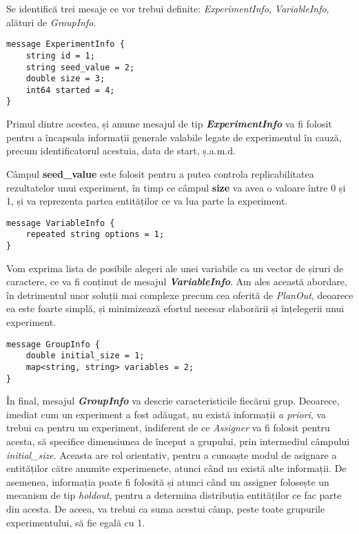 Se identifică trei mesaje ce vor trebui definite: \textit{ExperimentInfo}, \textit{VariableInfo}, alături de \textit{GroupInfo}.

\begin{center}
	\begin{lstlisting}[language=proto3]
message ExperimentInfo {
	string id = 1;
	string seed_value = 2;
	double size = 3;
	int64 started = 4;
}
	\end{lstlisting}
\end{center}

Primul dintre acestea, și anume mesajul de tip \textbf{\textit{ExperimentInfo}} va fi folosit pentru a încapsula informații generale valabile legate de experimentul în cauză, precum identificatorul acestuia, data de start, ș.a.m.d.

\begin{remark}
	Câmpul \textbf{seed\_value} este folosit pentru a putea controla replicabilitatea rezultatelor unui experiment, în timp ce câmpul \textbf{size} va avea o valoare între 0 și 1, și va reprezenta partea entităților ce va lua parte la experiment.
\end{remark}

\begin{lstlisting}[language=proto3]
message VariableInfo {
	repeated string options = 1;
}
\end{lstlisting}

Vom exprima lista de posibile alegeri ale unei variabile ca un vector de șiruri de caractere, ce va fi conținut de mesajul \textbf{\textit{VariableInfo}}. Am ales această abordare, în detrimentul unor soluții mai complexe precum cea oferită de \textit{PlanOut}, deoarece ea este foarte simplă, și minimizează efortul necesar elaborării și înțelegerii unui experiment.

\begin{center}
	\begin{lstlisting}[language=proto3]
message GroupInfo {
	double initial_size = 1;
	map<string, string> variables = 2;
}
	\end{lstlisting}
\end{center}

În final, mesajul \textbf{\textit{GroupInfo}} va descrie caracteristicile fiecărui grup. Deoarece, imediat cum un experiment a fost adăugat, nu există informații \textit{a priori}, va trebui ca pentru un experiment, indiferent de ce \textit{Assigner} va fi folosit pentru acesta, să specifice dimensiunea de început a grupului, prin intermediul câmpului \textit{initial\_size}. Aceasta are rol orientativ, pentru a cunoaște modul de asignare a entităților către anumite experimenete, atunci când nu există alte informații. De asemenea, informația poate fi folosită și atunci când un assigner folosește un mecanism de tip \textit{holdout}, pentru a determina distribuția entităților ce fac parte din acesta. De aceea, va trebui ca suma acestui câmp, peste toate grupurile experimentului, să fie egală cu 1.

